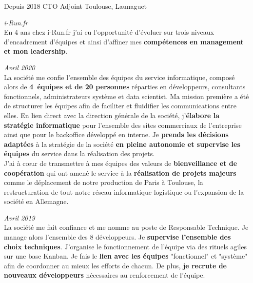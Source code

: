 \documentclass{friggeri-cv} 	%
\begin{document}
\begin{entrylist}
\entry
{Depuis 2018}
{CTO Adjoint}
{Toulouse, Launaguet}
{\vspace{-0.2cm}\emph{i-Run.fr} \\

En 4 ans chez i-Run.fr j’ai eu l’opportunité d’évoluer sur trois niveaux d’encadrement d’équipes et ainsi d’affiner mes \textbf{compétences en management et mon leadership}.
\begin{description}[leftmargin=0cm]
    \item [\hspace*{-1cm}\bodyfont{|} \normalfont \textbf{\color{orange}CTO \color{headercolor}Adjoint}] \hfill \textit{Avril 2020}\\
    La société me confie l’ensemble des équipes du service informatique, composé alors de \textbf{4~équipes et de 20 personnes} réparties en développeurs, consultants fonctionnels, administrateurs système et data scientist. Ma mission première a été de structurer les équipes afin de faciliter et fluidifier les communications entre elles. En lien direct avec la direction générale de la société, j’\textbf{élabore la stratégie informatique} pour l’ensemble des sites commerciaux de l’entreprise ainsi que pour le backoffice développé en interne. Je \textbf{prends les décisions adaptées} à la stratégie de la société \textbf{en pleine autonomie et supervise les équipes} du service dans la réalisation des projets.\\
    J’ai à c\oe{ur} de transmettre à mes équipes des valeurs de \textbf{bienveillance et de coopération} qui ont amené le service à la \textbf{réalisation de projets majeurs} comme le déplacement de notre production de Paris à Toulouse, la restructuration de tout notre réseau informatique logistique ou l’expansion de la société en Allemagne.
    \item [\hspace*{-1cm}\bodyfont{|} \normalfont \textbf{\color{orange}Responsable \color{headercolor}Technique}] \hfill \textit{Avril 2019}\\
    La société me fait confiance et me nomme au poste de Responsable Technique. Je manage alors l’ensemble des 8 développeurs. Je \textbf{supervise l’ensemble des choix techniques}. J’organise le fonctionnement de l’équipe via des rituels agiles sur une base Kanban. Je fais le \textbf{lien avec les équipes} "fonctionnel" et "système" afin de coordonner au mieux les efforts de chacun. De plus, \textbf{je recrute de nouveaux développeurs} nécessaires au renforcement de l’équipe.

\end{description}}
\end{entrylist}
\end{document}
